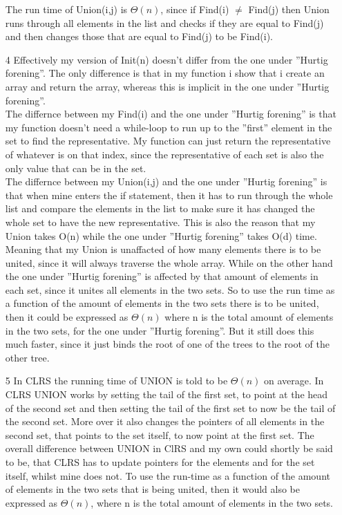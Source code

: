 \documentclass[a4paper]{article}
\begin{document}
\begin{itemize}[label=(\arabic*)]
        The run time of Union(i,j) is $\Theta(n)$, since if Find(i) $\neq$ Find(j) then Union runs through all elements in the list and
        checks if they are equal to Find(j) and then changes those that are equal to Find(j) to be Find(i).\\

    \item[4]
        Effectively my version of Init(n) doesn't differ from the one under ''Hurtig forening''. The only difference is that in my 
        function i show that i create an array and return the array, whereas this is implicit in the one under ''Hurtig forening''.\\

        The differnce between my Find(i) and the one under ''Hurtig forening'' is that my function doesn't need a while-loop to run up
        to the ''first'' element in the set to find the representative. My function can just return the representative of whatever is 
        on that index, since the representative of each set is also the only value that can be in the set.\\

        The differnce between my Union(i,j) and the one under ''Hurtig forening'' is that when mine enters the if statement, then it has
        to run through the whole list and compare the elements in the list to make sure it has changed the whole set to have the new 
        representative. This is also the reason that my Union takes O(n) while the one under ''Hurtig forening'' takes O(d) time. 
        Meaning that my Union is unaffacted of how many elements there is to be united, since it will always traverse the whole array.
        While on the other hand the one under ''Hurtig forening'' is affected by that amount of elements in each set, since it unites
        all elements in the two sets. So to use the run time as a function of the amount of elements in the two sets there is to be 
        united, then it could be expressed as $\Theta(n)$ where n is the total amount of elements in the two sets, for the one under 
        ''Hurtig forening''. But it still does this much faster, since it just binds the root of one of the trees to the root of the 
        other tree.\\
        \newpage
    \item[5] 
        In CLRS the running time of UNION is told to be $\Theta(n)$ on average. In CLRS UNION works by setting the tail of the first 
        set, to point at the head of the second set and then setting the tail of the first set to now be the tail of the second set.
        More over it also changes the pointers of all elements in the second set, that points to the set itself, to now point at the 
        first set.
        The overall difference between UNION in ClRS and my own could shortly be said to be, that CLRS has to update pointers for the
        elements and for the set itself, whilst mine does not.
        To use the run-time as a function of the amount of elements in the two sets that is being united, then it would also be expressed as
        $\Theta(n)$, where n is the total amount of elements in the two sets.


\end{itemize}
\end{document}
